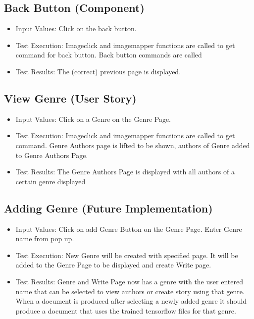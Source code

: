 \documentclass[12pt]{article}
\begin{document}
\subsection{Back Button (Component)}

\begin{itemize}
\item Input Values: Click on the back button. 
\item Test Execution: Imageclick and imagemapper functions are called to get command for back button. Back button commands are called
\item Test Results: The (correct) previous page is displayed.
\end{itemize}

\subsection{View Genre (User Story)}

\begin{itemize}
\item Input Values: Click on a Genre on the Genre Page.
\item Test Execution: Imageclick and imagemapper functions are called to get command. Genre Authors page is lifted to be shown, authors of Genre added to Genre Authors Page.
\item Test Results: The Genre Authors Page is displayed with all authors of a certain genre displayed
\end{itemize}

\subsection{Adding Genre (Future Implementation)}

\begin{itemize}
\item Input Values: Click on add Genre Button on the Genre Page. Enter Genre name from pop up.
\item Test Execution: New Genre will be created with specified page. It will be added to the Genre Page to be displayed and create Write page.
\item Test Results: Genre and Write Page now has a genre with the user entered name that can be selected to view authors or create story using that genre. When a document is produced after selecting a newly added genre it should produce a document that uses the trained tensorflow files for that genre.
\end{itemize}
\end{document}
